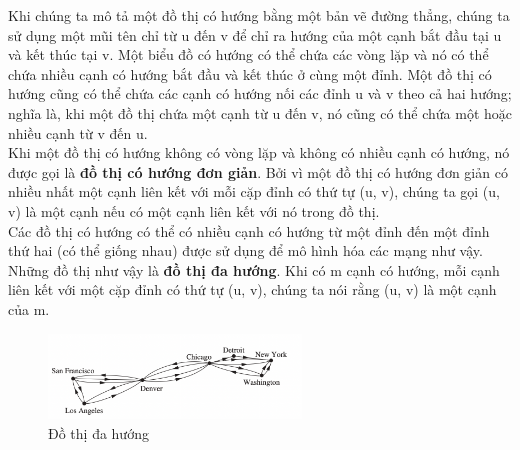 \begin{enumerate}
    Khi chúng ta mô tả một đồ thị có hướng bằng một bản vẽ đường thẳng, chúng ta sử dụng một mũi tên chỉ từ u đến v để chỉ ra hướng của một cạnh bắt đầu tại u và kết thúc tại v. Một biểu đồ có hướng có thể chứa các vòng lặp và nó có thể chứa nhiều cạnh có hướng bắt đầu và kết thúc ở cùng một đỉnh. Một đồ thị có hướng cũng có thể chứa các cạnh có hướng nối các đỉnh u và v theo cả hai hướng; nghĩa là, khi một đồ thị chứa một cạnh từ u đến v, nó cũng có thể chứa một hoặc nhiều cạnh từ v đến u.\\
    Khi một đồ thị có hướng không có vòng lặp và không có nhiều cạnh có hướng, nó được gọi là \textbf{đồ thị có hướng đơn giản}. Bởi vì một đồ thị có hướng đơn giản có nhiều nhất một cạnh liên kết với mỗi cặp đỉnh có thứ tự (u, v), chúng ta gọi (u, v) là một cạnh nếu có một cạnh liên kết với nó trong đồ thị.\\
    Các đồ thị có hướng có thể có nhiều cạnh có hướng từ một đỉnh đến một đỉnh thứ hai (có thể giống nhau) được sử dụng để mô hình hóa các mạng như vậy. Những đồ thị như vậy là \textbf{đồ thị đa hướng}. Khi có m cạnh có hướng, mỗi cạnh liên kết với một cặp đỉnh có thứ tự (u, v), chúng ta nói rằng (u, v) là một cạnh của m.\\
    \begin{figure}[H] %
        \centering %
        \includegraphics[width=0.6\textwidth]{assets/dothi_dahuong.png} 
        \caption{Đồ thị đa hướng} %
        \label{fig:gr_1.1.4}
    \end{figure}
\end{enumerate}
